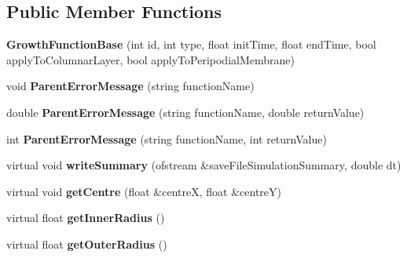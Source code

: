 \subsection*{Public Member Functions}
\begin{DoxyCompactItemize}
\item 
\hypertarget{classGrowthFunctionBase_a061b31ad8a0cb228628c7104029a94bf}{}{\bfseries Growth\+Function\+Base} (int id, int type, float init\+Time, float end\+Time, bool apply\+To\+Columnar\+Layer, bool apply\+To\+Peripodial\+Membrane)\label{classGrowthFunctionBase_a061b31ad8a0cb228628c7104029a94bf}

\item 
\hypertarget{classGrowthFunctionBase_ad5b4e88d33c4b72444c5c25c25ab68fb}{}void {\bfseries Parent\+Error\+Message} (string function\+Name)\label{classGrowthFunctionBase_ad5b4e88d33c4b72444c5c25c25ab68fb}

\item 
\hypertarget{classGrowthFunctionBase_aed234af9feb797628d4a2d598dcf9632}{}double {\bfseries Parent\+Error\+Message} (string function\+Name, double return\+Value)\label{classGrowthFunctionBase_aed234af9feb797628d4a2d598dcf9632}

\item 
\hypertarget{classGrowthFunctionBase_a9097ca54f854aa0d1c8d220c971580dd}{}int {\bfseries Parent\+Error\+Message} (string function\+Name, int return\+Value)\label{classGrowthFunctionBase_a9097ca54f854aa0d1c8d220c971580dd}

\item 
\hypertarget{classGrowthFunctionBase_abd31142fe0bcc9a95a39c85cb55438a8}{}virtual void {\bfseries write\+Summary} (ofstream \&save\+File\+Simulation\+Summary, double dt)\label{classGrowthFunctionBase_abd31142fe0bcc9a95a39c85cb55438a8}

\item 
\hypertarget{classGrowthFunctionBase_aa031bd3d28993402ee5bdb3d8cae7fa6}{}virtual void {\bfseries get\+Centre} (float \&centre\+X, float \&centre\+Y)\label{classGrowthFunctionBase_aa031bd3d28993402ee5bdb3d8cae7fa6}

\item 
\hypertarget{classGrowthFunctionBase_a05ace7e6cb21566ad03e72e56962d58b}{}virtual float {\bfseries get\+Inner\+Radius} ()\label{classGrowthFunctionBase_a05ace7e6cb21566ad03e72e56962d58b}

\item 
\hypertarget{classGrowthFunctionBase_a2ba8f7659e1c0546998671458943233d}{}virtual float {\bfseries get\+Outer\+Radius} ()\label{classGrowthFunctionBase_a2ba8f7659e1c0546998671458943233d}


\end{DoxyCompactItemize}
